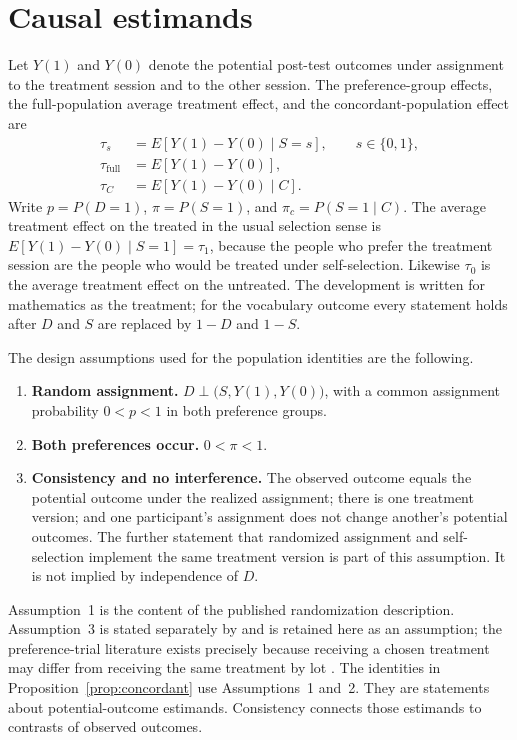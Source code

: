 \documentclass[twoside,11pt]{article}
\begin{document}
\section{Causal estimands}
\label{sec:theory}

Let $Y(1)$ and $Y(0)$ denote the potential post-test outcomes under assignment to the treatment session and to the other session. The preference-group effects, the full-population average treatment effect, and the concordant-population effect are
\begin{align*}
\tau_s &= E[Y(1)-Y(0)\mid S=s], \qquad s\in\{0,1\},\\
\tau_{\mathrm{full}} &= E[Y(1)-Y(0)],\\
\tau_C &= E[Y(1)-Y(0)\mid C].
\end{align*}
Write $p=P(D=1)$, $\pi=P(S=1)$, and $\pi_c=P(S=1\mid C)$. The average treatment effect on the treated in the usual selection sense is $E[Y(1)-Y(0)\mid S=1]=\tau_1$, because the people who prefer the treatment session are the people who would be treated under self-selection. Likewise $\tau_0$ is the average treatment effect on the untreated. The development is written for mathematics as the treatment; for the vocabulary outcome every statement holds after $D$ and $S$ are replaced by $1-D$ and $1-S$.

The design assumptions used for the population identities are the following.

\begin{enumerate}
\item \textbf{Random assignment.} $D\perp\bigl(S,Y(1),Y(0)\bigr)$, with a common assignment probability $0<p<1$ in both preference groups.
\item \textbf{Both preferences occur.} $0<\pi<1$.
\item \textbf{Consistency and no interference.} The observed outcome equals the potential outcome under the realized assignment; there is one treatment version; and one participant's assignment does not change another's potential outcomes. The further statement that randomized assignment and self-selection implement the same treatment version is part of this assumption. It is not implied by independence of $D$.
\end{enumerate}

Assumption~1 is the content of the published randomization description. Assumption~3 is stated separately by \citet{keller2025} and is retained here as an assumption; the preference-trial literature exists precisely because receiving a chosen treatment may differ from receiving the same treatment by lot \citep{rucker1989,marcus2012}. The identities in Proposition~\ref{prop:concordant} use Assumptions~1 and~2. They are statements about potential-outcome estimands. Consistency connects those estimands to contrasts of observed outcomes.
\end{document}
